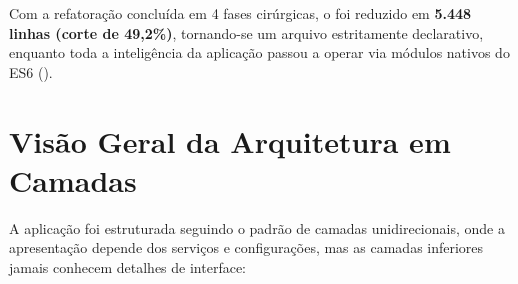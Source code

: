 Com a refatoração concluída em 4 fases cirúrgicas, o  foi reduzido em \textbf{5.448 linhas (corte de 49,2\%)}, tornando-se um arquivo estritamente declarativo, enquanto toda a inteligência da aplicação passou a operar via módulos nativos do ES6 ().

\section{Visão Geral da Arquitetura em Camadas}\label{sec:camadas}

A aplicação foi estruturada seguindo o padrão de camadas unidirecionais, onde a apresentação depende dos serviços e configurações, mas as camadas inferiores jamais conhecem detalhes de interface:

